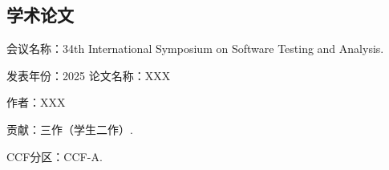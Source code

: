
\begin{resume}
  \label{works}
  \subsection*{学术论文}
  
  \begin{achievements}
      \item %
       会议名称：34th International Symposium on Software Testing and Analysis. 
       
       发表年份：2025
       论文名称：XXX
       
       作者：XXX
       
       

       贡献：三作（学生二作）. 
       
       CCF分区：CCF-A.
      
       
       
       
       
  \end{achievements}
  
  
  \end{resume}
  